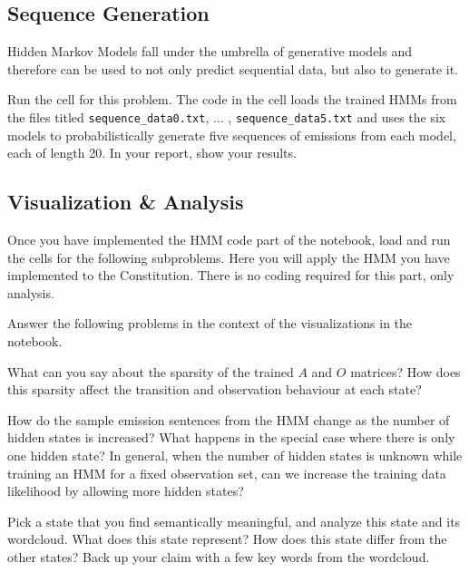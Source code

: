 \begin{solution}
\end{solution}

\subsection{Sequence Generation}
Hidden Markov Models fall under the umbrella of generative models and therefore can be used to not only predict sequential data, but also to generate it.

\problem[5] Run the cell for this problem. The code in the cell loads the trained HMMs from the files titled \texttt{sequence_data0.txt}, $\ldots$ , \texttt{sequence_data5.txt} and uses the six models to probabilistically generate five sequences of emissions from each model, each of length 20. In your report, show your results. 

\begin{solution}
\end{solution}

\subsection{Visualization \& Analysis}

Once you have implemented the HMM code part of the notebook, load and run the cells for the following subproblems. Here you will apply the HMM you have implemented to the Constitution. There is no coding required for this part, only analysis.

Answer the following problems in the context of the visualizations in the notebook.

\indent\problem[3] %
What can you say about the sparsity of the trained $A$ and $O$ matrices? How does this sparsity affect the transition and observation behaviour at each state?
\begin{solution}
\end{solution}

\indent\problem[5] %
How do the sample emission sentences from the HMM change as the number of hidden states is increased? What happens in the special case where there is only one hidden state? In general, when the number of hidden states is unknown while training an HMM for a fixed observation set, can we increase the training data likelihood by allowing more hidden states?

\begin{solution}
\end{solution}


\indent\problem[5] %
Pick a state that you find semantically meaningful, and analyze this state and its wordcloud. What does this state represent? How does this state differ from the other states? Back up your claim with a few key words from the wordcloud.
\begin{solution}
\end{solution}




